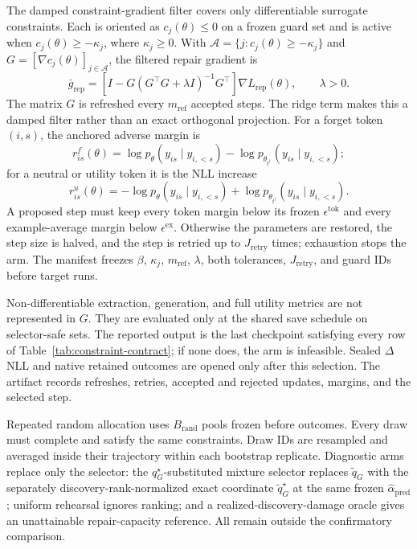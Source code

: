 The damped constraint-gradient filter covers only differentiable surrogate
constraints. Each is oriented as $c_j(\theta)\leq0$ on a frozen guard set and
is active when $c_j(\theta)\geq-\kappa_j$, where $\kappa_j\geq0$. With
$\mathcal A=\{j:c_j(\theta)\geq-\kappa_j\}$ and
$G=[\nabla c_j(\theta)]_{j\in\mathcal A}$, the filtered repair gradient is
\begin{equation}
  \bar g_{\mathrm{rep}}
  =
  \left[I-G(G^\top G+\lambda I)^{-1}G^\top\right]
  \nabla L_{\mathrm{rep}}(\theta),
  \qquad \lambda>0.
  \label{eq:repair-filter}
\end{equation}
The matrix $G$ is refreshed every $m_{\mathrm{ref}}$ accepted steps. The ridge term
makes this a damped filter rather than an exact orthogonal projection.
For a forget token $(i,s)$, the anchored adverse margin is
\[
 r^{f}_{is}(\theta)=\log p_\theta(y_{is}\mid y_{i,<s})-
 \log p_{\theta_{t^\dagger}}(y_{is}\mid y_{i,<s});
\]
for a neutral or utility token it is the NLL increase
\[
 r^{u}_{is}(\theta)=-\log p_\theta(y_{is}\mid y_{i,<s})+
 \log p_{\theta_{t^\dagger}}(y_{is}\mid y_{i,<s}).
\]
A proposed step must keep every token margin below its frozen
$\epsilon^{\mathrm{tok}}$ and every example-average margin below
$\epsilon^{\mathrm{ex}}$. Otherwise the parameters are restored, the step size is
halved, and the step is retried up to $J_{\mathrm{retry}}$ times; exhaustion stops
the arm. The manifest freezes $\beta$, $\kappa_j$, $m_{\mathrm{ref}}$, $\lambda$,
both tolerances, $J_{\mathrm{retry}}$, and guard IDs before target runs.

Non-differentiable extraction, generation, and full utility metrics are not
represented in $G$. They are evaluated only at the shared save schedule on
selector-safe sets. The reported output is the last checkpoint satisfying
every row of Table~\ref{tab:constraint-contract}; if none does, the arm is
infeasible. Sealed $\Delta$NLL and native retained outcomes are opened only
after this selection. The artifact records refreshes, retries, accepted and
rejected updates, margins, and the selected step.

Repeated random allocation uses $B_{\mathrm{rand}}$ pools frozen before outcomes.
Every draw must complete and satisfy the same constraints. Draw IDs are
resampled and averaged inside their trajectory within each bootstrap
replicate. Diagnostic arms replace only the selector: the
$q_G^\star$-substituted mixture selector replaces $\widetilde q_G$ with the
separately discovery-rank-normalized exact coordinate
$\widetilde q_G^\star$ at the same frozen $\widehat\alpha_{\mathrm{pred}}$;
uniform rehearsal ignores ranking; and a realized-discovery-damage oracle
gives an unattainable repair-capacity reference. All remain outside the confirmatory comparison.

